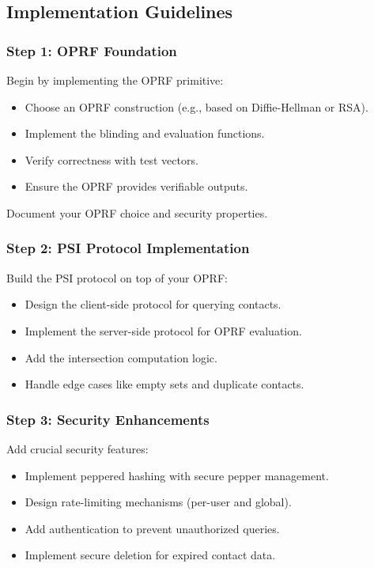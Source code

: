 \documentclass[10pt,a4paper,american]{exam}
\begin{document}
\subsection*{Implementation Guidelines}

\subsubsection*{Step 1: OPRF Foundation}
Begin by implementing the OPRF primitive:
\begin{itemize}
	\item Choose an OPRF construction (e.g., based on Diffie-Hellman or RSA).
	\item Implement the blinding and evaluation functions.
	\item Verify correctness with test vectors.
	\item Ensure the OPRF provides verifiable outputs.
\end{itemize}

Document your OPRF choice and security properties.

\subsubsection*{Step 2: PSI Protocol Implementation}
Build the PSI protocol on top of your OPRF:
\begin{itemize}
	\item Design the client-side protocol for querying contacts.
	\item Implement the server-side protocol for OPRF evaluation.
	\item Add the intersection computation logic.
	\item Handle edge cases like empty sets and duplicate contacts.
\end{itemize}

\subsubsection*{Step 3: Security Enhancements}
Add crucial security features:
\begin{itemize}
	\item Implement peppered hashing with secure pepper management.
	\item Design rate-limiting mechanisms (per-user and global).
	\item Add authentication to prevent unauthorized queries.
	\item Implement secure deletion for expired contact data.
\end{itemize}
\end{document}
